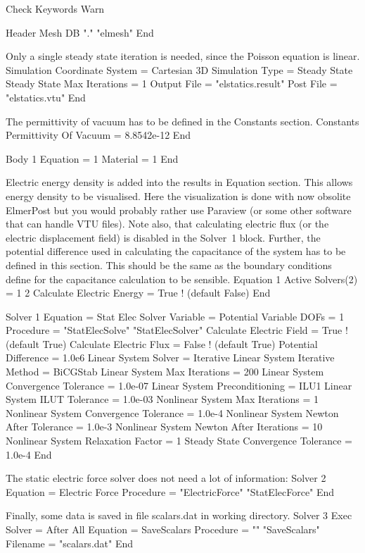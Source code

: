 \ttbegin
Check Keywords Warn

Header
  Mesh DB "." "elmesh"
End
\ttend

Only a single steady state iteration is needed, since the Poisson
equation is linear.
\ttbegin
Simulation
  Coordinate System = Cartesian 3D
  Simulation Type = Steady State
  Steady State Max Iterations = 1
  Output File = "elstatics.result"
  Post File = "elstatics.vtu"
End
\ttend

The permittivity of vacuum has to be defined in the Constants section.
\ttbegin
Constants
  Permittivity Of Vacuum = 8.8542e-12
End

Body 1
  Equation = 1
  Material = 1
End
\ttend

Electric energy density is added into the results in Equation
section. This allows energy density to be visualised.
Here the visualization is done with now obsolite ElmerPost
but you would probably rather use Paraview (or some other software that
can handle VTU files). 
Note also, that calculating electric flux (or the electric
displacement field) is disabled in the Solver~1 block. Further, the
potential difference used in calculating the capacitance of the system
has to be defined in this section. This should be the same as the
boundary conditions define for the capacitance calculation to be
sensible.
\ttbegin
Equation 1
  Active Solvers(2) = 1 2
  Calculate Electric Energy = True  ! (default False)
End

Solver 1
  Equation = Stat Elec Solver
  Variable = Potential
  Variable DOFs = 1
  Procedure = "StatElecSolve" "StatElecSolver"
  Calculate Electric Field = True  ! (default True)
  Calculate Electric Flux = False  ! (default True)
  Potential Difference = 1.0e6
  Linear System Solver = Iterative
  Linear System Iterative Method = BiCGStab
  Linear System Max Iterations = 200
  Linear System Convergence Tolerance = 1.0e-07
  Linear System Preconditioning = ILU1
  Linear System ILUT Tolerance = 1.0e-03
  Nonlinear System Max Iterations = 1
  Nonlinear System Convergence Tolerance = 1.0e-4
  Nonlinear System Newton After Tolerance = 1.0e-3
  Nonlinear System Newton After Iterations = 10
  Nonlinear System Relaxation Factor = 1
  Steady State Convergence Tolerance = 1.0e-4
End
\ttend

The static electric force solver does not need a lot of
information:
\ttbegin
Solver 2
  Equation = Electric Force
  Procedure = "ElectricForce" "StatElecForce"
End
\ttend

Finally, some data is saved in file scalars.dat in working directory.
\ttbegin
Solver 3
  Exec Solver = After All
  Equation = SaveScalars
  Procedure = "" "SaveScalars"
  Filename = "scalars.dat"
End
\ttend

